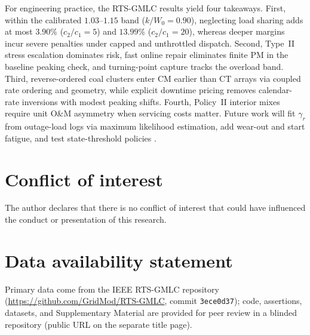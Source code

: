 \documentclass{elektr}
\begin{document}
For engineering practice, the RTS-GMLC results yield four takeaways. First, within the calibrated $1.03$--$1.15$ band ($k/W_0 = 0.90$), neglecting load sharing adds at most $3.90\%$ ($c_2/c_1 = 5$) and $13.99\%$ ($c_2/c_1 = 20$), whereas deeper margins incur severe penalties under capped and unthrottled dispatch. Second, Type~II stress escalation dominates risk, fast online repair eliminates finite PM in the baseline peaking check, and turning-point capture tracks the overload band. Third, reverse-ordered coal clusters enter CM earlier than CT arrays via coupled rate ordering and geometry, while explicit downtime pricing removes calendar-rate inversions with modest peaking shifts. Fourth, Policy~II interior mixes require unit O\&M asymmetry when servicing costs matter. Future work will fit $\gamma_r$ from outage-load logs via maximum likelihood estimation, add wear-out and start fatigue, and test state-threshold policies \cite{hamdan2021,qi2024}.

\section*{Conflict of interest}
The author declares that there is no conflict of interest that could have influenced the conduct or presentation of this research.

\section*{Data availability statement}
Primary data come from the IEEE RTS-GMLC repository (\url{https://github.com/GridMod/RTS-GMLC}, commit \texttt{3ece0d37}); code, assertions, datasets, and Supplementary Material are provided for peer review in a blinded repository (public URL on the separate title page).
\end{document}
